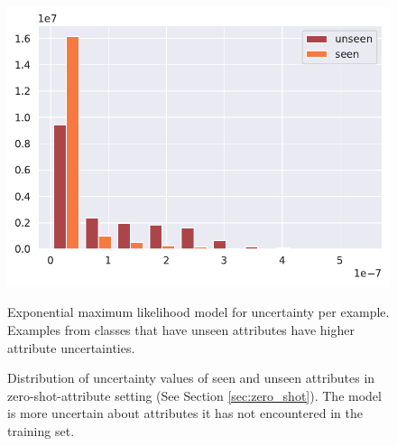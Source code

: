 \documentclass[a4paper,cleardoubleempty,BCOR1cm, 11pt]{report}
\begin{document}
\begin{figure}[t!]
	\centering
	\begin{minipage}[t]{0.45\textwidth}
		\centering
		\includegraphics[width=1\textwidth]{images/zero_shot_class_uncertainty_hist.pdf} 
		\caption{Exponential maximum likelihood model for uncertainty per example. Examples from classes that have unseen attributes have higher attribute uncertainties.}
		\label{fig:unseen_classes}
	\end{minipage}\hfill
	\begin{minipage}[t]{0.45\textwidth}
		\centering
		\caption{Distribution of uncertainty values of seen and unseen attributes in zero-shot-attribute setting (See Section \ref{sec:zero_shot}). The model is more uncertain about attributes it has not encountered in the training set.}
	\end{minipage}
\end{figure}
\end{document}
